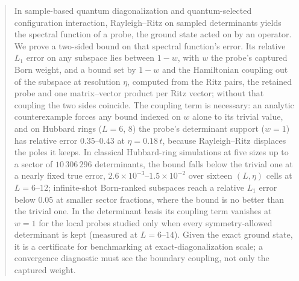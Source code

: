 \documentclass[
  aip,              %
  jcp,              %
  10pt,             %
  onecolumn,        %
  amsmath,amssymb,  %
  groupedaddress,   %
  nofootinbib,      %
  longbibliography, %
  floatfix          %
]{revtex4-2}
\begin{document}
%
%
%
%
%
%
%
%
%
%
%
%
%
%
%
%
%
%
%
%
%
%
%
%
%
%
%
%
%
%
%
%
%
%
%
%
%
%
%
%
%
%
%
%
%
%
%
%
%
%
%
%
%
%
%
%
%
%
%
%
%
%
%
%
%
%
\begin{abstract}
In sample-based quantum diagonalization and quantum-selected configuration interaction,
Rayleigh--Ritz on sampled determinants yields the spectral function of a probe, the ground state
acted on by an operator. We prove a two-sided bound on that
spectral function's error. Its relative $L_1$ error on any subspace lies between
$1-w$, with $w$ the probe's captured Born weight, and a bound set by $1-w$ and the Hamiltonian
coupling out of the subspace at resolution $\eta$, computed from the Ritz pairs, the retained probe
and one matrix--vector product per Ritz vector; without that coupling the two sides coincide. The coupling term is necessary:
an analytic counterexample forces any bound indexed on $w$ alone to its trivial value, and on
Hubbard rings ($L=6$, $8$) the probe's determinant support ($w=1$) has relative error
$0.35$--$0.43$ at $\eta=0.18\,t$, because Rayleigh--Ritz displaces the poles it keeps. In
classical Hubbard-ring simulations at five sizes up to a sector of $10\,306\,296$
determinants, the bound falls below the trivial one at a nearly fixed true error,
$2.6\times10^{-3}$--$1.5\times10^{-2}$ over sixteen $(L,\eta)$ cells at $L=6$--$12$; infinite-shot Born-ranked
subspaces reach a relative $L_1$ error below $0.05$ at smaller sector fractions, where the bound is
no better than the trivial one. In the determinant basis its coupling term vanishes at $w=1$ for
the local probes studied only when every symmetry-allowed determinant is kept (measured at
$L=6$--$14$). Given the exact ground state, it is a certificate for benchmarking at exact-diagonalization scale; a
convergence diagnostic must see the boundary coupling, not only the captured weight.
\end{abstract}

\maketitle


%
%
%
%

\end{document}
